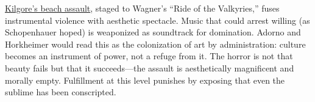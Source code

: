 \hyperref[scene:kilgore-beach]{Kilgore's beach assault}, staged to Wagner's ``Ride of the
Valkyries,'' fuses instrumental violence with aesthetic spectacle. Music that could arrest
willing (as Schopenhauer hoped) is weaponized as soundtrack for domination. Adorno and
Horkheimer would read this as the colonization of art by administration: culture becomes an
instrument of power, not a refuge
from it. The horror is not that beauty fails but that it succeeds---the assault is
aesthetically magnificent and morally empty. Fulfillment at this level punishes by exposing
that even the sublime has been conscripted.
